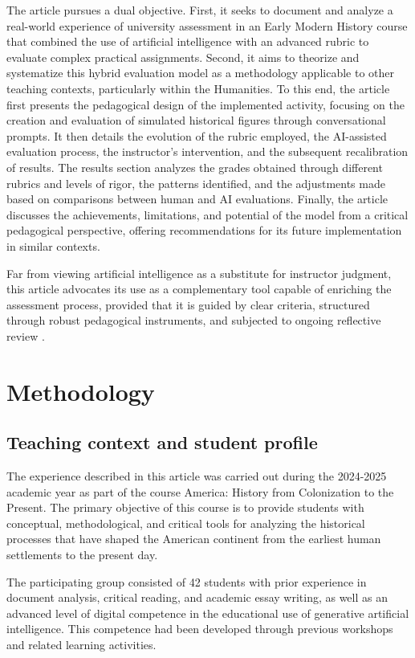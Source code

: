 \documentclass[english]{textolivre}
\begin{document}
The article pursues a dual objective. First, it seeks to document and analyze a real-world experience of university assessment in an Early Modern History course that combined the use of artificial intelligence with an advanced rubric to evaluate complex practical assignments. Second, it aims to theorize and systematize this hybrid evaluation model as a methodology applicable to other teaching contexts, particularly within the Humanities. To this end, the article first presents the pedagogical design of the implemented activity, focusing on the creation and evaluation of simulated historical figures through conversational prompts. It then details the evolution of the rubric employed, the AI-assisted evaluation process, the instructor’s intervention, and the subsequent recalibration of results. The results section analyzes the grades obtained through different rubrics and levels of rigor, the patterns identified, and the adjustments made based on comparisons between human and AI evaluations. Finally, the article discusses the achievements, limitations, and potential of the model from a critical pedagogical perspective, offering recommendations for its future implementation in similar contexts.

Far from viewing artificial intelligence as a substitute for instructor judgment, this article advocates its use as a complementary tool capable of enriching the assessment process, provided that it is guided by clear criteria, structured through robust pedagogical instruments, and subjected to ongoing reflective review \cite{evangelista2025, luo2025, selwyn2021}.

\section{Methodology}
\subsection{Teaching context and student profile}
The experience described in this article was carried out during the 2024-2025 academic year as part of the course America: History from Colonization to the Present. The primary objective of this course is to provide students with conceptual, methodological, and critical tools for analyzing the historical processes that have shaped the American continent from the earliest human settlements to the present day.

The participating group consisted of 42 students with prior experience in document analysis, critical reading, and academic essay writing, as well as an advanced level of digital competence in the educational use of generative artificial intelligence. This competence had been developed through previous workshops and related learning activities.
\end{document}
